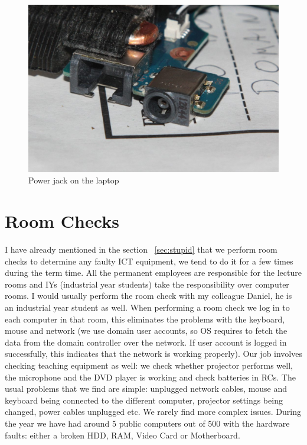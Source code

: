 \documentclass[10pt,a4paper,headinclude=true,twoside]{report}
\begin{document}
\begin{figure}[H]
\centering
\centerline{\includegraphics[scale=0.4]{./powerJack}}
\caption{Power jack on the laptop}
\label{fig:power jack}
\end{figure}

\section{Room Checks}
I have already mentioned in the section ~\ref{sec:stupid} that we perform room checks to determine any faulty ICT equipment, we tend to do it for a few times during the term time. All the permanent employees are responsible for the lecture rooms and IYs (industrial year students) take the responsibility over computer rooms. I would usually perform the room check with my colleague Daniel, he is an industrial year student as well. When performing a room check we log in to each computer in that room, this eliminates the problems with the keyboard, mouse and network (we use domain user accounts, so OS requires to fetch the data from the domain controller over the network. If user account is logged in successfully, this indicates that the network is working properly). Our job involves checking teaching equipment as well: we check whether projector performs well, the microphone and the DVD player is working and check batteries in RCs. The usual problems that we find are simple: unplugged network cables, mouse and keyboard being connected to the different computer, projector settings being changed, power cables unplugged etc. We rarely find more complex issues. During the year we have had around 5 public computers out of 500 with the hardware faults: either a broken HDD, RAM, Video Card or Motherboard. 
\end{document}
